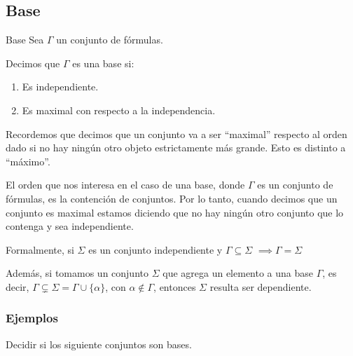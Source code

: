\subsection{Base}

\begin{definicion}{Base}{}
    Sea $\Gamma$ un conjunto de fórmulas.

    \medskip

    Decimos que $\Gamma$ es una base si:
    \begin{enumerate}
        \item Es independiente.
        \item Es maximal con respecto a la independencia.
    \end{enumerate}
\end{definicion}


Recordemos que decimos que un conjunto va a ser ``maximal'' respecto al orden
dado si no hay ningún otro objeto estrictamente más grande. Esto es distinto
a ``máximo''.

El orden que nos interesa en el caso de una base, donde $\Gamma$ es un
conjunto de fórmulas, es la contención de conjuntos. 
Por lo tanto, cuando decimos que un conjunto es maximal estamos diciendo que no
hay ningún otro conjunto que lo contenga y sea independiente.

Formalmente, si $\Sigma$ es un conjunto independiente y 
$\Gamma \subseteq \Sigma$ $\implies \Gamma = \Sigma$

%
Además, si tomamos un conjunto $\Sigma$ que agrega un elemento a una base 
$\Gamma$, es decir, $\Gamma \varsubsetneq \Sigma = \Gamma \cup \{\alpha\}$, 
con $\alpha \notin \Gamma$, entonces $\Sigma$ resulta ser dependiente.

\subsubsection{Ejemplos}

Decidir si los siguiente conjuntos son bases.

